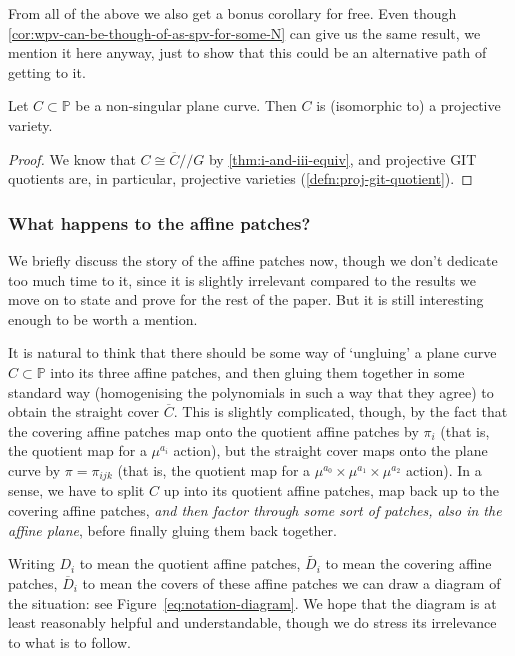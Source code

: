 \documentclass[10pt,notitlepage]{article}
\numberwithin{equation}{subsection}
\newcommand{\pee}{\mathbb{P}}
\newcommand{\cover}[1]{\overline{#1}}
\newcommand{\othercover}[1]{\widetilde{#1}}
\newcommand{\sslash}{/\!\!/}
\begin{document}
        From all of the above we also get a bonus corollary for free.
        Even though \cref{cor:wpv-can-be-though-of-as-spv-for-some-N} can give us the same result, we mention it here anyway, just to show that this could be an alternative path of getting to it.

        \begin{corollary}
            Let $C\subset\pee$ be a non-singular plane curve.
            Then $C$ is (isomorphic to) a projective variety.
        \end{corollary}

        \begin{proof}
            We know that $C\cong\cover{C}\sslash G$ by \cref{thm:i-and-iii-equiv}, and projective GIT quotients are, in particular, projective varieties (\cref{defn:proj-git-quotient}).
        \end{proof}



        \subsubsection{What happens to the affine patches?} %
        \label{ssub:what_happens_to_the_affine_patches_}

        We briefly discuss the story of the affine patches now, though we don't dedicate too much time to it, since it is slightly irrelevant compared to the results we move on to state and prove for the rest of the paper.
        But it is still interesting enough to be worth a mention.

        It is natural to think that there should be some way of `ungluing' a plane curve $C\subset\pee$ into its three affine patches, and then gluing them together in some standard way (homogenising the polynomials in such a way that they agree) to obtain the straight cover $\cover{C}$.
        This is slightly complicated, though, by the fact that the covering affine patches map onto the quotient affine patches by $\pi_i$ (that is, the quotient map for a $\mu^{a_i}$ action), but the straight cover maps onto the plane curve by $\pi=\pi_{ijk}$ (that is, the quotient map for a $\mu^{a_0}\times\mu^{a_1}\times\mu^{a_2}$ action).
        In a sense, we have to split $C$ up into its quotient affine patches, map back up to the covering affine patches, \emph{and then factor through some sort of patches, also in the affine plane}, before finally gluing them back together.

        Writing $D_i$ to mean the quotient affine patches, $\othercover{D_i}$ to mean the covering affine patches, $\cover{D}_i$ to mean the covers of these affine patches we can draw a diagram of the situation: see Figure~\ref{eq:notation-diagram}.
        We hope that the diagram is at least reasonably helpful and understandable, though we do stress its irrelevance to what is to follow.
\end{document}
